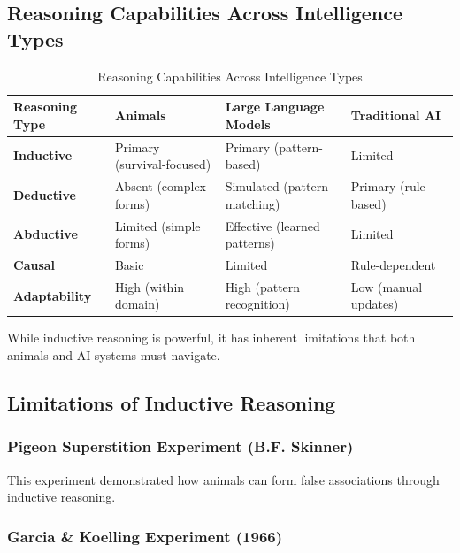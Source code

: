 \subsection{Reasoning Capabilities Across Intelligence Types}
\label{subsec:reasoning-capabilities}

\begin{table}[h!]
\centering
\begin{tabular}{|p{2.5cm}|p{3cm}|p{3.5cm}|p{3cm}|}
\hline
\textbf{Reasoning Type} & \textbf{Animals} & \textbf{Large Language Models} & \textbf{Traditional AI} \\
\hline
\textbf{Inductive} & Primary (survival-focused) & Primary (pattern-based) & Limited \\
\hline
\textbf{Deductive} & Absent (complex forms) & Simulated (pattern matching) & Primary (rule-based) \\
\hline
\textbf{Abductive} & Limited (simple forms) & Effective (learned patterns) & Limited \\
\hline
\textbf{Causal} & Basic & Limited & Rule-dependent \\
\hline
\textbf{Adaptability} & High (within domain) & High (pattern recognition) & Low (manual updates) \\
\hline
\end{tabular}
\caption{Reasoning Capabilities Across Intelligence Types}
\label{tab:reasoning-capabilities}
\end{table}

While inductive reasoning is powerful, it has inherent limitations that both animals and AI systems must navigate.

\subsection{Limitations of Inductive Reasoning}
\label{subsec:inductive-limitations}

\subsubsection{Pigeon Superstition Experiment (B.F. Skinner)}
\label{subsubsec:pigeon-superstition}

This experiment demonstrated how animals can form false associations through inductive reasoning.

\subsubsection{Garcia \& Koelling Experiment (1966)}
\label{subsubsec:garcia-koelling}

